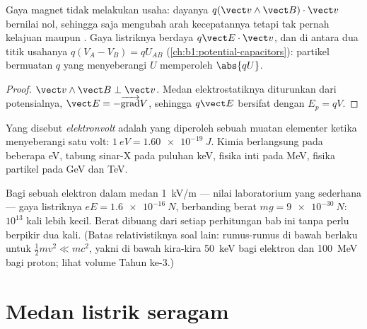 \begin{proposition}\label{prop:b1:charged-particles:work}
Gaya magnet tidak melakukan usaha: dayanya $q(\vect v\wedge\vect B)\cdot\vect v$
bernilai nol, sehingga  saja mengubah arah kecepatannya
tetapi tak pernah kelajuan maupun . Gaya listriknya
berdaya $q\vect E\cdot\vect v$, dan di antara dua titik usahanya $q(V_A - V_B) =
qU_{AB}$ (\cref{ch:b1:potential-capacitors}): partikel bermuatan $q$
yang menyeberangi  $U$ memperoleh  $\abs{qU}$.
\end{proposition}

\begin{proof}
$\vect v\wedge\vect B \perp \vect v$. Medan elektrostatiknya diturunkan dari
potensialnya, $\vect E = -\overrightarrow{\operatorname{grad}}V$, sehingga $q\vect E$
bersifat  dengan $E_p = qV$.
\end{proof}

\begin{definition}[Elektronvolt]\label{def:b1:charged-particles:eV}
Yang disebut \emph{elektronvolt} adalah  yang diperoleh
sebuah muatan elementer ketika menyeberangi satu volt: $\qty{1}{eV} = \qty{1.60e-19}{J}$.
Kimia berlangsung pada beberapa eV, tabung sinar-X pada puluhan keV,
fisika inti pada MeV, fisika partikel pada GeV dan TeV.
\end{definition}

\begin{remark}\label{rem:b1:charged-particles:gravity}
Bagi sebuah elektron dalam medan \qty{1}{kV/m} --- nilai laboratorium
yang sederhana --- gaya listriknya $eE = \qty{1.6e-16}{N}$, berbanding berat
$mg = \qty{9e-30}{N}$: $10^{13}$ kali lebih kecil. Berat dibuang dari
setiap perhitungan bab ini tanpa perlu berpikir dua kali. (Batas
relativistiknya soal lain: rumus-rumus di bawah berlaku untuk
$\tfrac12 mv^2 \ll mc^2$, yakni di bawah kira-kira \qty{50}{keV} bagi elektron
dan \qty{100}{MeV} bagi proton; lihat volume Tahun ke-3.)
\end{remark}

\section{Medan listrik seragam}

